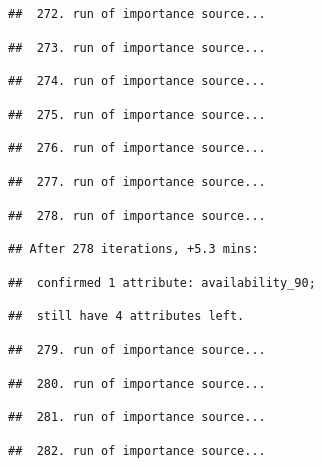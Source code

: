 \documentclass[
]{article}
\begin{document}
\begin{verbatim}
##  272. run of importance source...
\end{verbatim}

\begin{verbatim}
##  273. run of importance source...
\end{verbatim}

\begin{verbatim}
##  274. run of importance source...
\end{verbatim}

\begin{verbatim}
##  275. run of importance source...
\end{verbatim}

\begin{verbatim}
##  276. run of importance source...
\end{verbatim}

\begin{verbatim}
##  277. run of importance source...
\end{verbatim}

\begin{verbatim}
##  278. run of importance source...
\end{verbatim}

\begin{verbatim}
## After 278 iterations, +5.3 mins:
\end{verbatim}

\begin{verbatim}
##  confirmed 1 attribute: availability_90;
\end{verbatim}

\begin{verbatim}
##  still have 4 attributes left.
\end{verbatim}

\begin{verbatim}
##  279. run of importance source...
\end{verbatim}

\begin{verbatim}
##  280. run of importance source...
\end{verbatim}

\begin{verbatim}
##  281. run of importance source...
\end{verbatim}

\begin{verbatim}
##  282. run of importance source...
\end{verbatim}
\end{document}
